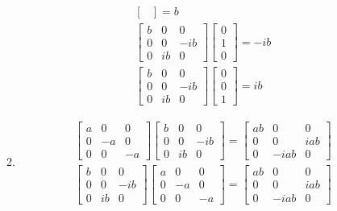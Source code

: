 \documentclass[12pt]{article}
\begin{document}
\begin{enumerate}
\begin{enumerate}
\begin{gather}
\begin{bmatrix}
        \end{bmatrix}=b\\
        \begin{bmatrix}
          b & 0  & 0   \\
          0 & 0  & -ib \\
          0 & ib & 0
        \end{bmatrix}
        \begin{bmatrix}
          0 \\
          1 \\
          0
        \end{bmatrix}=-ib\\
        \begin{bmatrix}
          b & 0  & 0   \\
          0 & 0  & -ib \\
          0 & ib & 0
        \end{bmatrix}
        \begin{bmatrix}
          0 \\
          0 \\
          1
        \end{bmatrix}=ib
      \end{gather}
      \item
      \begin{gather}
        \begin{bmatrix}
          a & 0  & 0  \\
          0 & -a & 0  \\
          0 & 0  & -a
        \end{bmatrix}
        \begin{bmatrix}
          b & 0  & 0   \\
          0 & 0  & -ib \\
          0 & ib & 0
        \end{bmatrix}=
        \begin{bmatrix}
          ab & 0    & 0   \\
          0  & 0    & iab \\
          0  & -iab & 0
        \end{bmatrix}\\
        \begin{bmatrix}
          b & 0  & 0   \\
          0 & 0  & -ib \\
          0 & ib & 0
        \end{bmatrix}
        \begin{bmatrix}
          a & 0  & 0  \\
          0 & -a & 0  \\
          0 & 0  & -a
        \end{bmatrix}=
        \begin{bmatrix}
          ab & 0    & 0   \\
          0  & 0    & iab \\
          0  & -iab & 0
        \end{bmatrix}
      \end{gather}
    \end{enumerate}
  \end{enumerate}
\end{document}
